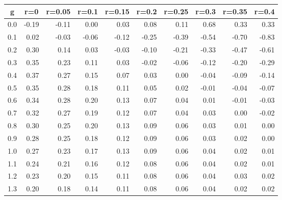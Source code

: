 %
\begin{table}[!tbp]
 \begin{center}
 \begin{tabular}{rrrrrrrrrr}\hline\hline
\multicolumn{1}{c}{g}&\multicolumn{1}{c}{r=0}&\multicolumn{1}{c}{r=0.05}&\multicolumn{1}{c}{r=0.1}&\multicolumn{1}{c}{r=0.15}&\multicolumn{1}{c}{r=0.2}&\multicolumn{1}{c}{r=0.25}&\multicolumn{1}{c}{r=0.3}&\multicolumn{1}{c}{r=0.35}&\multicolumn{1}{c}{r=0.4}\tabularnewline
\hline
0.0&-0.19&-0.11& 0.00& 0.03& 0.08& 0.11& 0.68& 0.33& 0.33\tabularnewline
0.1& 0.02&-0.03&-0.06&-0.12&-0.25&-0.39&-0.54&-0.70&-0.83\tabularnewline
0.2& 0.30& 0.14& 0.03&-0.03&-0.10&-0.21&-0.33&-0.47&-0.61\tabularnewline
0.3& 0.35& 0.23& 0.11& 0.03&-0.02&-0.06&-0.12&-0.20&-0.29\tabularnewline
0.4& 0.37& 0.27& 0.15& 0.07& 0.03& 0.00&-0.04&-0.09&-0.14\tabularnewline
0.5& 0.35& 0.28& 0.18& 0.11& 0.05& 0.02&-0.01&-0.04&-0.07\tabularnewline
0.6& 0.34& 0.28& 0.20& 0.13& 0.07& 0.04& 0.01&-0.01&-0.03\tabularnewline
0.7& 0.32& 0.27& 0.19& 0.12& 0.07& 0.04& 0.03& 0.00&-0.02\tabularnewline
0.8& 0.30& 0.25& 0.20& 0.13& 0.09& 0.06& 0.03& 0.01& 0.00\tabularnewline
0.9& 0.28& 0.25& 0.18& 0.12& 0.09& 0.06& 0.03& 0.02& 0.00\tabularnewline
1.0& 0.27& 0.23& 0.17& 0.13& 0.09& 0.06& 0.04& 0.02& 0.01\tabularnewline
1.1& 0.24& 0.21& 0.16& 0.12& 0.08& 0.06& 0.04& 0.02& 0.01\tabularnewline
1.2& 0.23& 0.20& 0.15& 0.11& 0.08& 0.06& 0.04& 0.03& 0.02\tabularnewline
1.3& 0.20& 0.18& 0.14& 0.11& 0.08& 0.06& 0.04& 0.02& 0.02\tabularnewline
\hline
\end{tabular}

\end{center}

\end{table}

